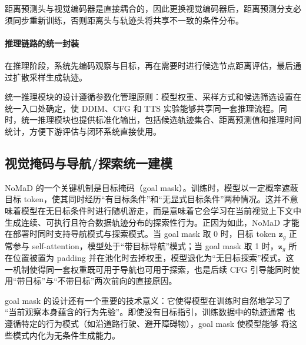 距离预测头与视觉编码器是直接耦合的，因此更换视觉编码器后，距离预测分支必须同步重新训练，否则距离头与轨迹头将共享不一致的条件分布。

\paragraph*{推理链路的统一封装}

在推理阶段，系统先编码观察与目标，再在需要时进行候选节点距离评估，最后通过扩散采样生成轨迹。

统一推理模块的设计遵循参数化管理原则：模型权重、采样方式和候选筛选设置在统一入口处确定，使 DDIM、CFG 和 TTS 实验能够共享同一套推理流程。同时，统一推理模块也提供标准化输出，包括候选轨迹集合、距离预测值和推理时间统计，方便下游评估与闭环系统直接使用。

\subsection{视觉掩码与导航/探索统一建模}

NoMaD 的一个关键机制是目标掩码（goal mask）。训练时，模型以一定概率遮蔽目标 token，使其同时经历``有目标条件''和``无显式目标条件''两种情况\cite{nomad2023}。这并不意味着模型在无目标条件时进行随机游走，而是意味着它会学习在当前视觉上下文中生成连续、可执行且符合数据轨迹分布的探索性行为。正因为如此，NoMaD 才能在部署时同时支持导航模式与探索模式。当 goal mask 取 0 时，目标 token $\mathbf{z}_g$ 正常参与 self-attention，模型处于``带目标导航''模式；当 goal mask 取 1 时，$\mathbf{z}_g$ 所在位置被置为 padding 并在池化时去掉权重，模型退化为``无目标探索''模式。这一机制使得同一套权重既可用于导航也可用于探索，也是后续 CFG 引导能同时使用``带目标''与``不带目标''两次前向的直接原因。

goal mask 的设计还有一个重要的技术意义：它使得模型在训练时自然地学习了
``当前观察本身蕴含的行为先验''。即使没有目标指引，训练数据中的轨迹通常
也遵循特定的行为模式（如沿道路行驶、避开障碍物），goal mask 使模型能够
将这些模式内化为无条件生成能力。

